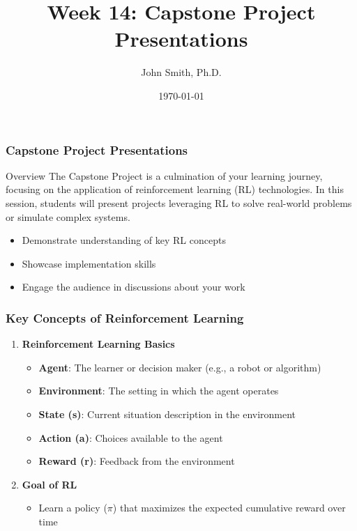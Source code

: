 \documentclass[aspectratio=169]{beamer}
\title[Capstone Project Presentations]{Week 14: Capstone Project Presentations}
\author[J. Smith]{John Smith, Ph.D.}
\institute[University Name]{
  Department of Computer Science\\
  University Name\\
  \vspace{0.3cm}
  Email: email@university.edu\\
  Website: www.university.edu
}
\date{\today}
\begin{document}
\frame{\titlepage}

\begin{frame}[fragile]
    \frametitle{Capstone Project Presentations}
    \begin{block}{Overview}
        The Capstone Project is a culmination of your learning journey, focusing on the application of reinforcement learning (RL) technologies. 
        In this session, students will present projects leveraging RL to solve real-world problems or simulate complex systems.
    \end{block}
    \begin{itemize}
        \item Demonstrate understanding of key RL concepts
        \item Showcase implementation skills
        \item Engage the audience in discussions about your work
    \end{itemize}
\end{frame}

\begin{frame}[fragile]
    \frametitle{Key Concepts of Reinforcement Learning}
    \begin{enumerate}
        \item \textbf{Reinforcement Learning Basics}
            \begin{itemize}
                \item \textbf{Agent}: The learner or decision maker (e.g., a robot or algorithm)
                \item \textbf{Environment}: The setting in which the agent operates
                \item \textbf{State (s)}: Current situation description in the environment
                \item \textbf{Action (a)}: Choices available to the agent
                \item \textbf{Reward (r)}: Feedback from the environment
            \end{itemize}
        \item \textbf{Goal of RL}
            \begin{itemize}
                \item Learn a policy ($\pi$) that maximizes the expected cumulative reward over time
            \end{itemize}
    \end{enumerate}
\end{frame}
\end{document}
